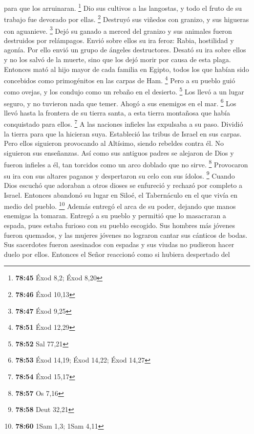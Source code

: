 para que los arruinaran. \footnote{\textbf{78:45} Éxod 8,2; Éxod 8,20}
 Dio sus cultivos a las langostas, y todo el fruto de su
trabajo fue devorado por ellas. \footnote{\textbf{78:46} Éxod 10,13}
 Destruyó sus viñedos con granizo, y sus higueras con
aguanieve. \footnote{\textbf{78:47} Éxod 9,25}  Dejó su
ganado a merced del granizo y sus animales fueron destruidos por
relámpagos.  Envió sobre ellos su ira feroz: Rabia,
hostilidad y agonía. Por ello envió un grupo de ángeles destructores.
 Desató su ira sobre ellos y no los salvó de la muerte,
sino que los dejó morir por causa de esta plaga.  Entonces
mató al hijo mayor de cada familia en Egipto, todos los que habían sido
concebidos como primogénitos en las carpas de Ham. \footnote{\textbf{78:51}
  Éxod 12,29}  Pero a su pueblo guió como ovejas, y los
condujo como un rebaño en el desierto. \footnote{\textbf{78:52} Sal
  77,21}  Los llevó a un lugar seguro, y no tuvieron nada
que temer. Ahogó a sus enemigos en el mar. \footnote{\textbf{78:53} Éxod
  14,19; Éxod 14,22; Éxod 14,27}  Los llevó hasta la
frontera de su tierra santa, a esta tierra montañosa que había
conquistado para ellos. \footnote{\textbf{78:54} Éxod 15,17}
 A las naciones infieles las expulsaba a su paso. Dividió
la tierra para que la hicieran suya. Estableció las tribus de Israel en
sus carpas.  Pero ellos siguieron provocando al Altísimo,
siendo rebeldes contra él. No siguieron sus enseñanzas. 
Así como sus antiguos padres se alejaron de Dios y fueron infieles a él,
tan torcidos como un arco doblado que no sirve. \footnote{\textbf{78:57}
  Os 7,16}  Provocaron su ira con sus altares paganos y
despertaron su celo con sus ídolos. \footnote{\textbf{78:58} Deut 32,21}
 Cuando Dios escuchó que adoraban a otros dioses se
enfureció y rechazó por completo a Israel.  Entonces
abandonó su lugar en Siloé, el Tabernáculo en el que vivía en medio del
pueblo. \footnote{\textbf{78:60} 1Sam 1,3; 1Sam 4,11} 
Además entregó el arca de su poder, dejando que manos enemigas la
tomaran.  Entregó a su pueblo y permitió que lo masacraran
a espada, pues estaba furioso con su pueblo escogido.  Sus
hombres más jóvenes fueron quemados, y las mujeres jóvenes no lograron
cantar sus cánticos de bodas.  Sus sacerdotes fueron
asesinados con espadas y sus viudas no pudieron hacer duelo por ellos.
 Entonces el Señor reaccionó como si hubiera despertado del
